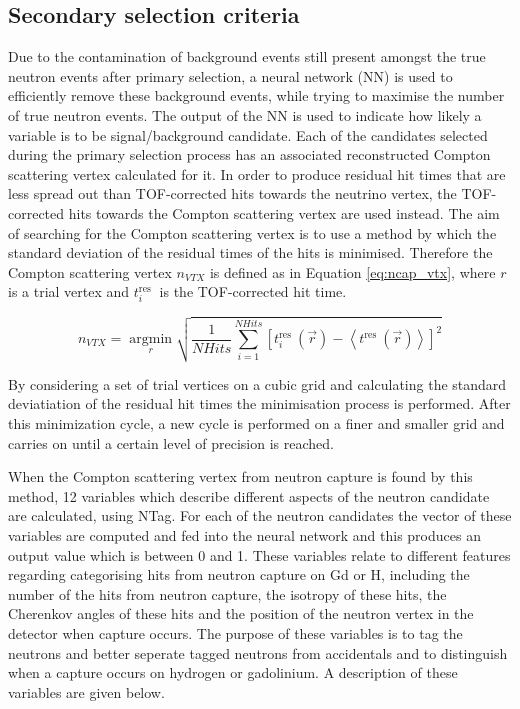 \subsection{Secondary selection criteria}
Due to the contamination of background events still present amongst the true neutron events after primary selection, a neural network (NN) is used to efficiently remove these background events, while trying to maximise the number of true neutron events. The output of the NN is used to indicate how likely a variable is to be signal/background candidate. Each of the candidates selected during the primary selection process has an associated reconstructed Compton scattering vertex calculated for it. In order to produce residual hit times that are less spread out than TOF-corrected hits towards the neutrino vertex, the TOF-corrected hits towards the Compton scattering vertex are used instead. The aim of searching for the Compton scattering vertex is to use a method by which the standard deviation of the residual times of the hits is minimised. Therefore the Compton scattering vertex $n_{VTX}$ is defined as in Equation \ref{eq:ncap_vtx}, where $r$ is a trial vertex and $t_i^{\text {res }}$ is the TOF-corrected hit time.

\begin{equation}
    n_{VTX}=\underset{r}{\operatorname{argmin}}\sqrt{\frac{1}{NHits} \sum_{i=1}^{NHits}\left[t_i^{\text {res }}(\vec{r})-\left\langle t^{\text {res }}(\vec{r})\right\rangle\right]^2}
\label{eq:ncap_vtx}
\end{equation}

 

By considering a set of trial vertices on a cubic grid and calculating the standard deviatiation of the residual hit times the minimisation process is performed. After this minimization cycle, a new cycle is performed on a finer and smaller grid and carries on until a certain level of precision is reached. 

When the Compton scattering vertex from neutron capture is found by this method, 12 variables which describe different aspects of the neutron candidate are calculated, using NTag. For each of the neutron candidates the vector of these variables are computed and fed into the neural network and this produces an output value which is between 0 and 1. These variables relate to different features regarding categorising hits from neutron capture on Gd or H, including the number of the hits from neutron capture, the isotropy of these hits, the Cherenkov angles of these hits and the position of the neutron vertex in the detector when capture occurs. The purpose of these variables is to tag the neutrons and better seperate tagged neutrons from accidentals and to distinguish when a capture occurs on hydrogen or gadolinium. A description of these variables are given below.


